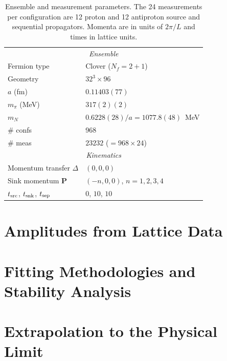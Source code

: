 \documentclass[aps,prd,twocolumn,amsmath,amssymb,floatfix]{revtex4-2}
\newcommand{\vect}[1]{\ensuremath{\boldsymbol{#1}}}
\begin{document}
\begin{table}[tb]
\caption{Ensemble and measurement parameters. The 24 measurements per configuration are 12 proton and 12 antiproton source and sequential propagators. Momenta are in units of $2\pi/L$ and times in lattice units.}
\label{tab:lat_setup}
\begin{ruledtabular}
\begin{tabular}{ll}
\multicolumn{2}{c}{\textit{Ensemble}} \\
Fermion type & Clover ($N_f=2+1$) \\
Geometry & $32^3\times96$ \\
$a$ (fm) & $0.11403(77)$ \\
$m_\pi$ (MeV) & $317(2)(2)$ \\
$m_N$ & $0.6228(28)/a=1077.8(48)$~MeV \\
\# confs & 968 \\
\# meas & $23232$ ($=968\times24$) \\
\multicolumn{2}{c}{\textit{Kinematics}} \\
Momentum transfer $\Delta$ & $(0,0,0)$ \\
Sink momentum $\vect{P}$ & $(-n,0,0)$, $n=1,2,3,4$ \\
$t_{\rm src}$, $t_{\rm snk}$, $t_{\rm sep}$ & $0$, $10$, $10$ \\
\end{tabular}
\end{ruledtabular}
\end{table}

\section{Amplitudes from Lattice Data}
\label{sec:amplitudes_lattice}


\section{Fitting Methodologies and Stability Analysis}
\label{sec:fitting_analysis}


\section{Extrapolation to the Physical Limit}
\label{sec:extrapolation}

\end{document}
